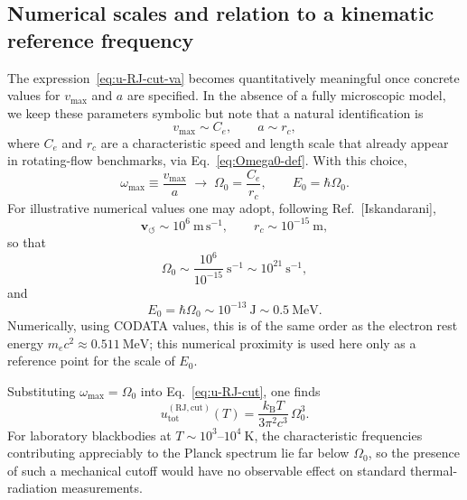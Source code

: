 \documentclass[11pt]{article}
\begin{document}
        \subsection{Numerical scales and relation to a kinematic reference frequency}

            The expression~\eqref{eq:u-RJ-cut-va} becomes quantitatively meaningful once concrete
            values for $v_{\max}$ and $a$ are specified. In the absence of a fully microscopic
            model, we keep these parameters symbolic but note that a natural identification is
            \begin{equation}
                v_{\max} \sim C_e, \qquad a \sim r_c,
            \end{equation}
            where $C_e$ and $r_c$ are a characteristic speed and length scale that already appear
            in rotating-flow benchmarks, via Eq.~\eqref{eq:Omega0-def}. With this choice,
            \begin{equation}
                \omega_{\max} \equiv \frac{v_{\max}}{a}
                \;\longrightarrow\;
                \Omega_0 = \frac{C_e}{r_c}, \qquad
                E_0 = \hbar\Omega_0.
            \end{equation}
            For illustrative numerical values one may adopt, following Ref.~[Iskandarani],
            \begin{equation}
                \mathbf{v}_{\scriptscriptstyle\boldsymbol{\circlearrowleft}} \sim 10^6~\mathrm{m\,s^{-1}}, \qquad
                r_c \sim 10^{-15}~\mathrm{m},
            \end{equation}
            so that
            \begin{equation}
                \Omega_0 \sim \frac{10^6}{10^{-15}}~\mathrm{s^{-1}}
                \sim 10^{21}~\mathrm{s^{-1}},
            \end{equation}
            and
            \begin{equation}
                E_0 = \hbar\Omega_0
                \sim 10^{-13}~\mathrm{J}
                \sim 0.5~\mathrm{MeV}.
            \end{equation}
            Numerically, using CODATA values, this is of the same order as the electron rest energy
            $m_e c^2 \approx 0.511~\mathrm{MeV}$; this numerical proximity is used here only as a
            reference point for the scale of $E_0$.

            Substituting $\omega_{\max} = \Omega_0$ into Eq.~\eqref{eq:u-RJ-cut}, one finds
            \begin{equation}
                u_{\mathrm{tot}}^{(\mathrm{RJ,cut})}(T)
                = \frac{k_{\mathrm B}T}{3\pi^2 c^3}\,\Omega_0^3.
            \end{equation}
            For laboratory blackbodies at $T\sim 10^3$--$10^4~\mathrm{K}$, the characteristic
            frequencies contributing appreciably to the Planck spectrum lie far below $\Omega_0$,
            so the presence of such a mechanical cutoff would have no observable effect on
            standard thermal-radiation measurements.
\end{document}
